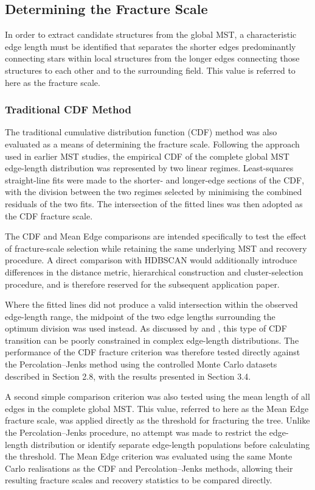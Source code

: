 \documentclass[fleqn,usenatbib]{mnras}
\begin{document}
\subsection{Determining the Fracture Scale}
In order to extract candidate structures from the global MST, a characteristic edge length must be identified that separates the shorter edges predominantly connecting stars within local structures from the longer edges connecting those structures to each other and to the surrounding field. This value is referred to here as the fracture scale. 

\subsubsection{Traditional CDF Method}
The traditional cumulative distribution function (CDF) method was also evaluated as a means of determining the fracture scale. Following the approach used in earlier MST studies, the empirical CDF of the complete global MST edge-length distribution was represented by two linear regimes. Least-squares straight-line fits were made to the shorter- and longer-edge sections of the CDF, with the division between the two regimes selected by minimising the combined residuals of the two fits. The intersection of the fitted lines was then adopted as the CDF fracture scale.

The CDF and Mean Edge comparisons are intended specifically to test the effect of fracture-scale selection while retaining the same underlying MST and recovery procedure. A direct comparison with HDBSCAN would additionally introduce differences in the distance metric, hierarchical construction and cluster-selection procedure, and is therefore reserved for the subsequent application paper.

Where the fitted lines did not produce a valid intersection within the observed edge-length range, the midpoint of the two edge lengths surrounding the optimum division was used instead. As discussed by \cite{Gallaway2012}  and  \cite{Kirk2014}, this type of CDF transition can be poorly constrained in complex edge-length distributions. The performance of the CDF fracture criterion was therefore tested directly against the Percolation–Jenks method using the controlled Monte Carlo datasets described in Section 2.8, with the results presented in Section 3.4.

A second simple comparison criterion was also tested using the mean length of all edges in the complete global MST. This value, referred to here as the Mean Edge fracture scale, was applied directly as the threshold for fracturing the tree. Unlike the Percolation–Jenks procedure, no attempt was made to restrict the edge-length distribution or identify separate edge-length populations before calculating the threshold. The Mean Edge criterion was evaluated using the same Monte Carlo realisations as the CDF and Percolation–Jenks methods, allowing their resulting fracture scales and recovery statistics to be compared directly.
\end{document}
